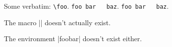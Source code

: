 \documentclass{nlctdoc}
\begin{document}
Some verbatim: \verb"\foo". \verb*"foo bar   baz".
\verb"foo bar   baz".

\index{\foo}

\DescribeMacro{\foo}The macro |\foo| doesn't actually exist.

The environment |foobar| doesn't exist either.

\PrintIndex
\end{document}
